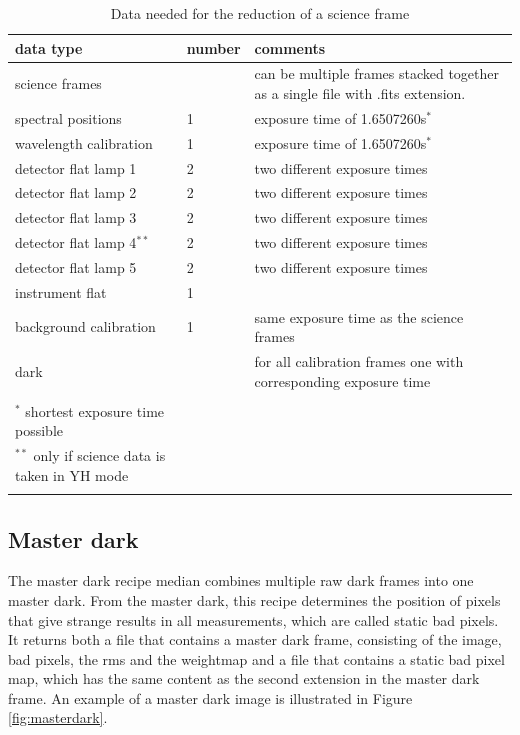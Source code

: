 \documentclass[twoside,single,12pt]{lion-msc}
\begin{document}
\begin{longtable}{| p{} | p{} | p{ }|}
\hline
\textbf{data type} & \textbf{number} & \textbf{comments}\\\hline
science frames&  &can be multiple frames stacked together as a single file with .fits extension.\\\hline
spectral positions & 1 & exposure time of 1.6507260s$^*$	\\\hline	
wavelength calibration & 1 & exposure time of 1.6507260s$^*$ \\\hline
detector flat lamp 1 & 2 & two different exposure times\\\hline
detector flat lamp 2 & 2 & two different exposure times\\\hline
detector flat lamp 3 & 2 & two different exposure times\\\hline
detector flat lamp 4$^{**}$ & 2 & two different exposure times\\\hline
detector flat lamp 5 & 2 & two different exposure times\\\hline
instrument flat & 1 & \\\hline
background calibration & 1 & same exposure time as the science frames\\\hline
dark & & for all calibration frames one with corresponding exposure time\\\hline
\caption*{\\$^*$ shortest exposure time possible\\ $^{**}$ only if science data is taken in YH mode}\\%
\caption{Data needed for the reduction of a science frame}%
\label{Tab:data}
\end{longtable}%

\subsection{Master dark}
The master dark recipe median combines multiple raw dark frames into one master dark. From the master dark, this recipe determines the position of pixels that give strange results in all measurements, which are called static bad pixels. It returns both a file that contains a master dark frame, consisting of the image, bad pixels, the rms and the weightmap and a file that contains a static bad pixel map, which has the same content as the second extension in the master dark frame. An example of a master dark image is illustrated in Figure \ref{fig:masterdark}. 
\bigskip
\end{document}
